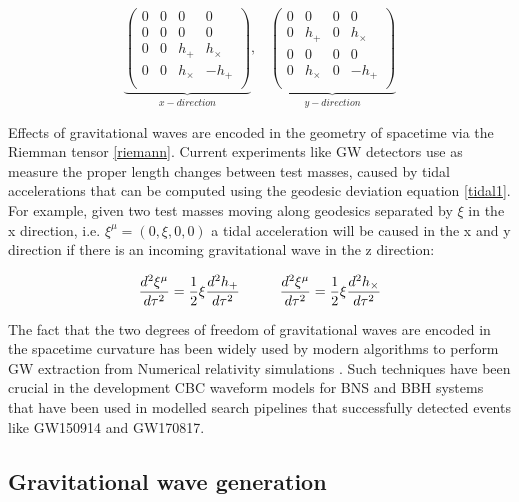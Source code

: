 \begin{equation}
\underbrace{\begin{pmatrix}
0&0&0&0 \\
0&0&0&0 \\
0&0&h_+& h_\times \\
0&0&h_\times& - h_+\\
\end{pmatrix}}_{x-direction},\;\;\; 
\underbrace{\begin{pmatrix}
0&0&0&0 \\
0&h_+&0&h_\times \\
0&0&0&0 \\
0&h_\times&0&-h_+ \\
\end{pmatrix}}_{y-direction}
\end{equation}


Effects of gravitational waves are encoded in the geometry of spacetime via the Riemman tensor \ref{riemann}. Current experiments like GW detectors use as measure the proper length changes between test masses, caused by tidal accelerations that can be computed using the geodesic deviation equation \ref{tidal1}. For example,  given two test masses moving along geodesics separated by $\xi$ in the x direction, i.e. $\xi^\mu = (0,\xi,0,0)$ a tidal acceleration will be caused in the x and y direction if there is an incoming gravitational wave in the z direction:

\begin{equation}
\frac{d^2 \xi^{\mu}}{d\tau^2} = \frac{1}{2}\xi \frac{d^2 h_+}{d\tau^2} \hspace{10mm} \frac{d^2 \xi^{\mu}}{d\tau^2} = \frac{1}{2}\xi \frac{d^2 h_\times}{d\tau^2}
\end{equation}

The fact that the two degrees of freedom of gravitational waves are encoded in the spacetime curvature has been widely used by modern algorithms to perform GW extraction from Numerical relativity simulations \cite{Bishop:2016lgv}. Such techniques have been crucial in the development CBC waveform models for BNS and BBH systems that have been used in modelled search pipelines that successfully detected events like GW150914\cite{LIGOScientific:2016aoc} and GW170817\cite{LIGOScientific:2017vwq}. 

\subsection{Gravitational wave generation}

